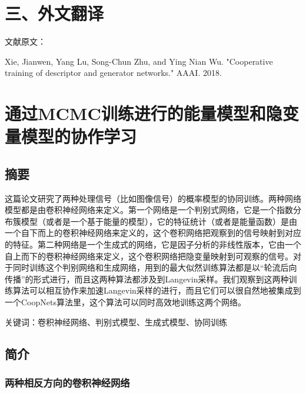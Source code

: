 
\chapter{三、外文翻译}

{
  \setlength{\parindent}{0em}

  文献原文：

  Xie, Jianwen, Yang Lu, Song-Chun Zhu, and Ying Nian Wu. "Cooperative training of descriptor and generator networks." AAAI. 2018. \par
}

\vspace{2em}

{
  \renewcommand{\cleardoublepage}{}
  \renewcommand{\clearpage}{}
  \titleformat{\chapter}[block]{\sanhao\songti\bfseries\filcenter}{}{0em}{}{}
  \chapter*{通过MCMC训练进行的能量模型和隐变量模型的协作学习}
}

\section*{摘要}

这篇论文研究了两种处理信号（比如图像信号）的概率模型的协同训练。两种网络模型都是由卷积神经网络来定义。第一个网络是一个判别式网络，它是一个指数分布簇模型（或者是一个基于能量的模型），它的特征统计（或者是能量函数）是由一个自下而上的卷积神经网络来定义的，这个卷积网络把观察到的信号映射到对应的特征。第二种网络是一个生成式的网络，它是因子分析的非线性版本，它由一个自上而下的卷积神经网络来定义，这个卷积网络把隐变量映射到可观察的信号。对于同时训练这个判别网络和生成网络，用到的最大似然训练算法都是以“轮流后向传播”的形式进行，而且这两种算法都涉及到Langevin采样。我们观察到这两种训练算法可以相互协作来加速Langevin采样的进行，而且它们可以很自然地被集成到一个CoopNets算法里，这个算法可以同时高效地训练这两个网络。

\bigskip
关键词：卷积神经网络、判别式模型、生成式模型、协同训练

\section{简介}

\subsection{两种相反方向的卷积神经网络}


